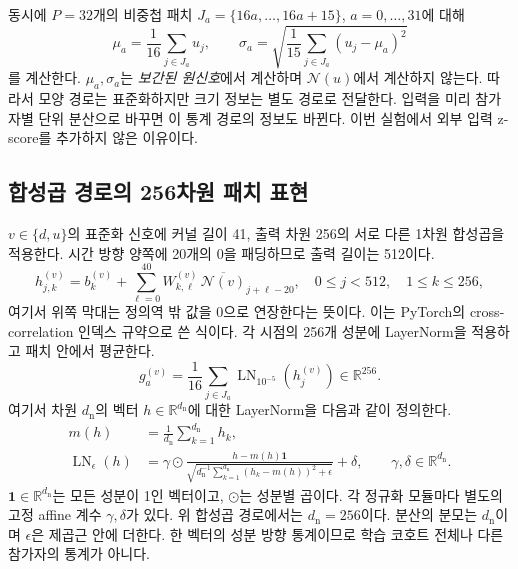 \documentclass[11pt,a4paper]{article}
\newcommand{\R}{\mathbb R}
\DeclareMathOperator{\LN}{LN}
\numberwithin{equation}{section}
\begin{document}
동시에 $P=32$개의 비중첩 패치
$J_a=\{16a,\ldots,16a+15\}$, $a=0,\ldots,31$에 대해
\begin{equation}
 \mu_a=\frac1{16}\sum_{j\in J_a}u_j,\qquad
 \sigma_a=\sqrt{\frac1{15}\sum_{j\in J_a}(u_j-\mu_a)^2}
 \label{eq:patchstats}
\end{equation}
를 계산한다. $\mu_a,\sigma_a$는 \emph{보간된 원신호}에서 계산하며
$\mathcal N(u)$에서 계산하지 않는다.
따라서 모양 경로는 표준화하지만 크기 정보는 별도 경로로 전달한다.
입력을 미리 참가자별 단위 분산으로 바꾸면 이 통계 경로의 정보도 바뀐다.
이번 실험에서 외부 입력 z-score를 추가하지 않은 이유이다.

\subsection{합성곱 경로의 256차원 패치 표현}
$v\in\{d,u\}$의 표준화 신호에 커널 길이 41, 출력 차원 256의
서로 다른 1차원 합성곱을 적용한다.
시간 방향 양쪽에 20개의 0을 패딩하므로 출력 길이는 512이다.
\begin{equation}
 h^{(v)}_{j,k}=b^{(v)}_k+
 \sum_{\ell=0}^{40}W^{(v)}_{k,\ell}\,
 \overline{\mathcal N(v)}_{j+\ell-20},
 \quad 0\le j<512,\quad1\le k\le256,
\end{equation}
여기서 위쪽 막대는 정의역 밖 값을 0으로 연장한다는 뜻이다.
이는 PyTorch의 cross-correlation 인덱스 규약으로 쓴 식이다.
각 시점의 256개 성분에 LayerNorm을 적용하고 패치 안에서 평균한다.
\begin{equation}
 g^{(v)}_a=\frac1{16}\sum_{j\in J_a}\LN_{10^{-5}}(h^{(v)}_j)
 \in\R^{256}.
\end{equation}
여기서 차원 $d_{\mathrm n}$의 벡터 $h\in\R^{d_{\mathrm n}}$에 대한
LayerNorm을 다음과 같이 정의한다.
\begin{align}
 m(h)&=\frac1{d_{\mathrm n}}\sum_{k=1}^{d_{\mathrm n}}h_k,\\
 \LN_\epsilon(h)&=\gamma\odot
 \frac{h-m(h)\bm1}
 {\sqrt{d_{\mathrm n}^{-1}\sum_{k=1}^{d_{\mathrm n}}(h_k-m(h))^2+\epsilon}}
 +\delta,\qquad \gamma,\delta\in\R^{d_{\mathrm n}}.
\end{align}
$\bm1\in\R^{d_{\mathrm n}}$는 모든 성분이 1인 벡터이고,
$\odot$는 성분별 곱이다. 각 정규화 모듈마다 별도의 고정 affine 계수
$\gamma,\delta$가 있다. 위 합성곱 경로에서는 $d_{\mathrm n}=256$이다.
분산의 분모는 $d_{\mathrm n}$이며 $\epsilon$은 제곱근 안에 더한다.
한 벡터의 성분 방향 통계이므로 학습 코호트 전체나 다른 참가자의 통계가 아니다.
\end{document}
